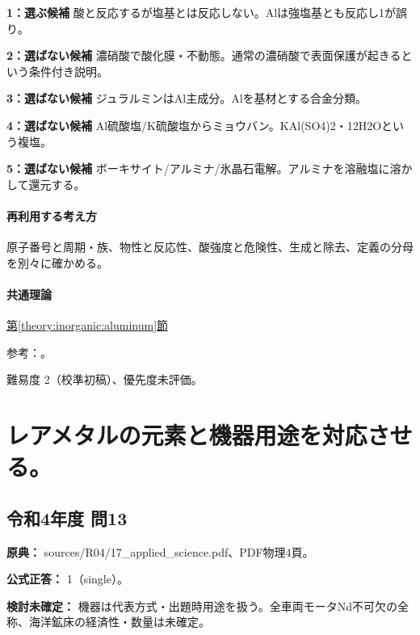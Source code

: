\noindent\textbf{1：選ぶ候補} 酸と反応するが塩基とは反応しない。Alは強塩基とも反応し1が誤り。\par

\noindent\textbf{2：選ばない候補} 濃硝酸で酸化膜・不動態。通常の濃硝酸で表面保護が起きるという条件付き説明。\par

\noindent\textbf{3：選ばない候補} ジュラルミンはAl主成分。Alを基材とする合金分類。\par

\noindent\textbf{4：選ばない候補} Al硫酸塩/K硫酸塩からミョウバン。KAl(SO4)2・12H2Oという複塩。\par

\noindent\textbf{5：選ばない候補} ボーキサイト/アルミナ/氷晶石電解。アルミナを溶融塩に溶かして還元する。\par

\paragraph{再利用する考え方} 原子番号と周期・族、物性と反応性、酸強度と危険性、生成と除去、定義の分母を別々に確かめる。

\paragraph{共通理論} \hyperref[theory:inorganic:aluminum]{第\ref*{theory:inorganic:aluminum}節}

\par 参考：\cite{inorganic_al_ref}。

\par 難易度 2（校準初稿）、優先度未評価。

\section{レアメタルの元素と機器用途を対応させる。}

\subsection{令和4年度 問13}
\label{q:r04-reg-applied-13}

\noindent\textbf{原典：} sources/R04/17\_applied\_science.pdf、PDF物理4頁。

\textbf{公式正答：} 1（single）。

\par\textbf{検討未確定：} 機器は代表方式・出題時用途を扱う。全車両モータNd不可欠の全称、海洋鉱床の経済性・数量は未確定。

